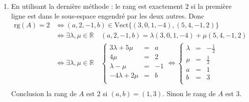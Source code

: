 \documentclass[11pt,a4paper]{article}
\newcommand{\Rr}{\mathbb{R}} \newcommand{\R}{\mathbb{R}}
\begin{document}
\begin{enumerate}
  \item En utilisant la dernière méthode : le rang est exactement $2$ si la première ligne est dans le sous-espace engendré
par les deux autres.
Donc 
\begin{align*}
\textrm{rg}(A) = 2
 & \iff (a,2,-1,b) \in \textrm{Vect} \big\{ (3,0,1,-4), (5,4,-1,2) \big\} \\
 & \iff \exists \lambda,\mu \in \Rr \quad (a,2,-1,b) = \lambda (3,0,1,-4) + \mu(5,4,-1,2) \\
 & \iff \exists \lambda,\mu \in \Rr \quad 
\left\{
\begin{array}{rcl}
3\lambda+5\mu &=& a \\
4\mu &=& 2 \\
\lambda-\mu &=& -1 \\
-4\lambda+2\mu &=& b \\
\end{array}
\right. 
 \iff  \left\{
\begin{array}{rcl}
\lambda &=& -\frac12 \\
\mu &=& \frac12 \\
a &=& 1 \\
b &=& 3 \\
\end{array} 
\right.\\  
\end{align*}
Conclusion la rang de $A$ est $2$ si $(a,b)=(1,3)$. Sinon le rang de $A$ est $3$.
\end{enumerate}
\end{document}

